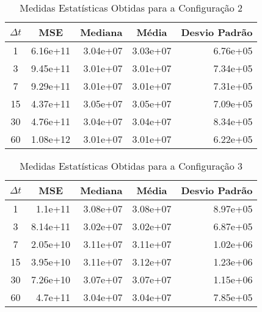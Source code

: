 \documentclass{ieeeaccess}
\begin{document}
\begin{table}[!h]
	\caption{Medidas Estatísticas Obtidas para a Configuração 2} %
	\label{tab6}
	\setlength{\tabcolsep}{3pt}
	\setlength\extrarowheight{2.5pt}
	
	\centering
	\begin{tabular}{| c | r | r | r | r |}
		\hline
		\multicolumn{1}{|c|}{$\Delta t$} &\multicolumn{1}{c|}{MSE} & \multicolumn{1}{c|}{Mediana} & \multicolumn{1}{c|}{Média} & \multicolumn{1}{c|}{Desvio Padrão} \\ \hline
		
		1 & 6.16e+11 & 3.04e+07 & 3.03e+07 & 6.76e+05 \\
		3 & 9.45e+11 & 3.01e+07 & 3.01e+07 & 7.34e+05 \\
		7 & 9.29e+11 & 3.01e+07 & 3.01e+07 & 7.31e+05 \\
		15 & 4.37e+11 & 3.05e+07 & 3.05e+07 & 7.09e+05 \\
		30 & 4.76e+11 & 3.04e+07 & 3.04e+07 & 8.34e+05 \\
		60 & 1.08e+12 & 3.01e+07 & 3.01e+07 & 6.22e+05 \\ \hline
		
	\end{tabular}
\end{table}

\begin{table}[!h]
	\caption{Medidas Estatísticas Obtidas para a Configuração 3} %
	\label{tab7}
	\setlength{\tabcolsep}{3pt}
	\setlength\extrarowheight{2.5pt}
	
	\centering
	\begin{tabular}{| c | r | r | r | r |}
		\hline
		\multicolumn{1}{|c|}{$\Delta t$} &\multicolumn{1}{c|}{MSE} & \multicolumn{1}{c|}{Mediana} & \multicolumn{1}{c|}{Média} & \multicolumn{1}{c|}{Desvio Padrão} \\ \hline
		
		1 & 1.1e+11 & 3.08e+07 & 3.08e+07 & 8.97e+05 \\
		3 & 8.14e+11 & 3.02e+07 & 3.02e+07 & 6.87e+05 \\
		7 & 2.05e+10 & 3.11e+07 & 3.11e+07 & 1.02e+06 \\
		15 & 3.95e+10 & 3.11e+07 & 3.12e+07 & 1.23e+06 \\
		30 & 7.26e+10 & 3.07e+07 & 3.07e+07 & 1.15e+06 \\
		60 & 4.7e+11 & 3.04e+07 & 3.04e+07 & 7.85e+05 \\ \hline
		
	\end{tabular}
\end{table}
\end{document}
